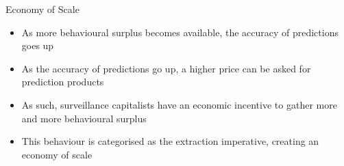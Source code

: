 \documentclass[aspectratio=169]{beamer}
\begin{document}
    {%
    \begin{frame}{Economy of Scale}
        \begin{itemize}
            \item As more behavioural surplus becomes available, the accuracy
                of predictions goes up
            \item As the accuracy of predictions go up, a higher price can be
                asked for \alert{prediction products}
            \pause{}
            \item As such, surveillance capitalists have an economic incentive
                to gather more and more behavioural surplus
            \item This behaviour is categorised as the \alert{extraction
                imperative}, creating an economy of scale
        \end{itemize}
    \end{frame}
    }
\end{document}
